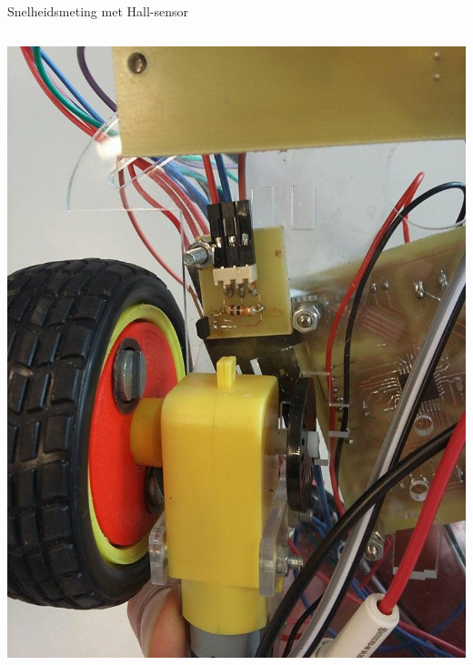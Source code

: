 \documentclass[t,12pt,english
\ifx\beamermode\undefined\else,\beamermode\fi
]{beamer}
\begin{document}
\begin{frame}{Snelheidsmeting met Hall-sensor}
\begin{columns}
\begin{column}{0.5\textwidth}
\begin{center}
			\includegraphics[width=\textwidth,height=0.7\textheight,keepaspectratio]{hallsensor.png}
		\end{center}
	\end{column}
\end{columns} 
\end{frame}

\end{document}
